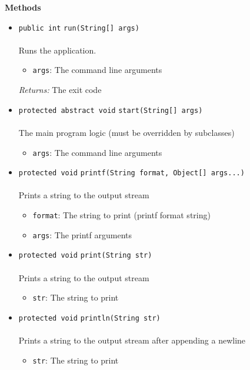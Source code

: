 \textbf{\sffamily Methods}
\begin{itemize}
\item \lstinline|public int| \lstinline|run|\lstinline|(String[] args)|\\ \\[-0.6em]
Runs the application.
\begin{itemize}
\item \lstinline|args|: The command line arguments
\end{itemize}

\emph{Returns:} The exit code

\item \lstinline|protected abstract void| \lstinline|start|\lstinline|(String[] args)|\\ \\[-0.6em]
The main program logic (must be overridden by subclasses)
\begin{itemize}
\item \lstinline|args|: The command line arguments
\end{itemize}



\item \lstinline|protected void| \lstinline|printf|\lstinline|(String format, Object[] args...)|\\ \\[-0.6em]
Prints a string to the output stream
\begin{itemize}
\item \lstinline|format|: The string to print (printf format string)
\item \lstinline|args|: The printf arguments
\end{itemize}



\item \lstinline|protected void| \lstinline|print|\lstinline|(String str)|\\ \\[-0.6em]
Prints a string to the output stream
\begin{itemize}
\item \lstinline|str|: The string to print
\end{itemize}



\item \lstinline|protected void| \lstinline|println|\lstinline|(String str)|\\ \\[-0.6em]
Prints a string to the output stream after appending a newline
\begin{itemize}
\item \lstinline|str|: The string to print
\end{itemize}




\end{itemize}
